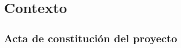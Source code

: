 \chapter{Contexto}
\label{chapter:context}


\section{Acta de constitución del proyecto}
\label{section:acta}




